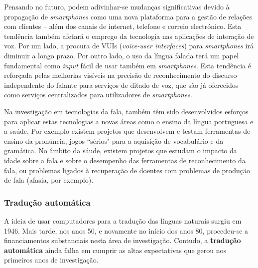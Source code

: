 \begin{multicols}{2}
Pensando no futuro, podem adivinhar-se mudanças significativas devido à propagação de \textit{smartphones} como uma nova plataforma para a gestão de relações com clientes – além dos canais de internet, telefone e correio electrónico. Esta tendência também afetará o emprego da tecnologia nas aplicações de interação de voz. Por um lado, a procura de VUIs (\textit{voice-user interfaces}) para \textit{smartphones} irá diminuir a longo prazo. Por outro lado, o uso da língua falada terá um papel fundamental como \textit{input} fácil de usar também em \textit{smartphones}. Esta tendência é reforçada pelas melhorias visíveis na precisão de reconhecimento do discurso independente do falante para serviços de ditado de voz, que são já oferecidos como serviços centralizados para utilizadores de \textit{smartphones}. 

Na investigação em tecnologias da fala, também têm sido desenvolvidos esforços para aplicar estas tecnologias a novas áreas como o ensino da língua portuguesa e a saúde. Por exemplo existem projetos que desenvolvem e testam ferramentas de ensino da pronúncia, jogos “sérios" para a aquisição de vocabulário e da gramática. No âmbito da sáude, existem projetos que estudam o impacto da idade sobre a fala e sobre o desempenho das ferramentas de reconhecimento da fala, ou problemas ligados à recuperação de doentes com problemas de produção de fala (afasia, por exemplo).

\subsubsection{Tradução automática}

 A ideia de usar computadores para a tradução das línguas naturais surgiu em 1946. Mais tarde, nos anos 50, e novamente no início dos anos 80, procedeu-se a financiamentos substanciais nesta área de investigação. Contudo, a \textbf{tradução automática} ainda falha em cumprir as altas expectativas que gerou nos primeiros anos de investigação.



\end{multicols}

